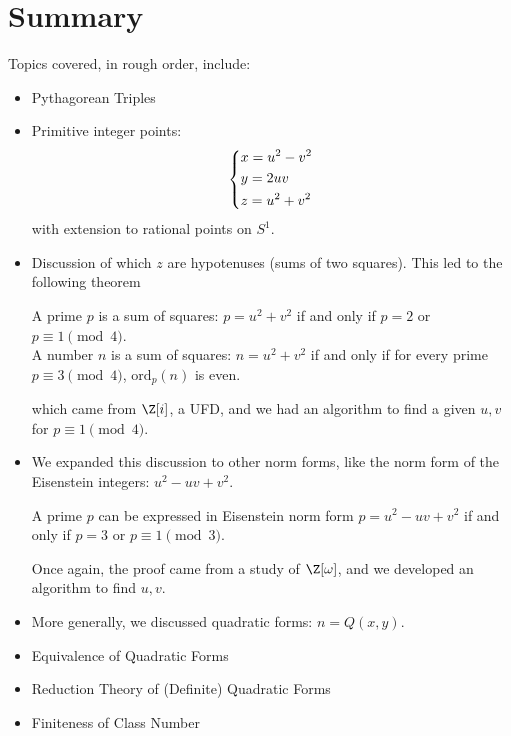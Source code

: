 \documentclass[11pt]{article}
\begin{document}
\section{Summary}
Topics covered, in rough order, include:
\begin{itemize}
    \item Pythagorean Triples
    \item Primitive integer points:
    \[
        \begin{dcases}
            x = u^2 - v^2 \\
            y = 2uv \\
            z = u^2 + v^2
        \end{dcases}
    \]
    with extension to rational points on $S^1$.
    \item Discussion of which $z$ are hypotenuses (sums of two squares). This led to the following theorem
    
    \begin{theorem}
    A prime $p$ is a sum of squares: $p = u^2 + v^2$ if and only if $p = 2$ or $p \equiv 1 \pmod{4}$. \\

    A number $n$ is a sum of squares: $n = u^2 + v^2$ if and only if for every prime $p \equiv 3 \pmod 4$, $\mathrm{ord}_p(n)$ is even. 
    \end{theorem}
    
    which came from $\Z[i]$, a UFD, and we had an algorithm to find a given $u, v$ for $p \equiv 1 \pmod 4$. 
    \item We expanded this discussion to other norm forms, like the norm form of the Eisenstein integers: $u^2 - uv + v^2$. 
    
    \begin{theorem}
    A prime $p$ can be expressed in Eisenstein norm form $p = u^2 - uv + v^2$ if and only if $p = 3$ or $p \equiv 1 \pmod{3}$. \\      
    \end{theorem} 

    Once again, the proof came from a study of $\Z[\omega]$, and we developed an algorithm to find $u, v$. 

    \item More generally, we discussed quadratic forms: $n = Q(x, y)$.
    \item Equivalence of Quadratic Forms
    \item Reduction Theory of (Definite) Quadratic Forms 
    \item Finiteness of Class Number
\end{itemize}
\end{document}
